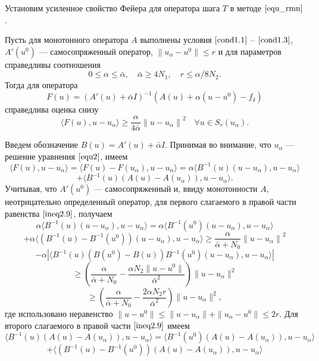 Установим усиленное свойство Фейера для оператора шага $T$ в методе $\eqref{equ_rmn}$.
\begin{theorem}\label{teo2.2} Пусть для монотонного оператора $A$ выполнены условия $\eqref{cond1.1}$ -- $\eqref{cond1.3}$, $A'(u^0)$ --- самосопряженный оператор, $\|u_\alpha-u^0\|\le r$ и для параметров справедливы соотношения 
	\begin{equation}\label{cond2.7}
	0\le\alpha\le\bar\alpha,\quad\bar\alpha\ge 4N_1,\quad r\le\alpha/8N_2.
	\end{equation}
	Тогда для оператора
	$$ F(u)=(A'(u)+\bar\alpha I)^{-1}(A(u)+\alpha(u-u^0)-f_\delta) $$
	справедлива оценка снизу
	\begin{equation}\label{est2.8}
	\langle F(u), u-u_\alpha\rangle\ge\frac{\alpha}{4\bar\alpha}{\|u-u_\alpha\|}^2 \quad \forall u \in S_r(u_\alpha).
	\end{equation}
\end{theorem}
\proof Введем обозначение $B(u)=A'(u)+\bar\alpha I$. Принимая во внимание, что $u_\alpha$ --- решение уравнения $\eqref{equ2}$, имеем
$$
\langle F(u), u-u_\alpha\rangle=\langle F(u)-F(u_\alpha), u-u_\alpha\rangle=\alpha\langle B^{-1}(u)(u-u_\alpha), u-u_\alpha\rangle$$ \begin{equation}\label{ineq2.9}+\langle B^{-1}(u)(A(u)-A(u_\alpha)), u-u_\alpha\rangle.
\end{equation}
Учитывая, что $A'(u^0)$ --- самосопряженный и, ввиду монотонности $A$, неотрицательно определенный оператор, для первого слагаемого в правой части равенства $\eqref{ineq2.9}$, получаем
$$\alpha\langle B^{-1}(u)(u-u_\alpha), u-u_\alpha\rangle=\alpha\langle B^{-1}(u^0)(u-u_\alpha), u-u_\alpha\rangle$$ $$+\alpha\langle (B^{-1}(u)-B^{-1}(u^0))(u-u_\alpha), u-u_\alpha\rangle \ge \frac{\alpha}{\bar\alpha+N_0}{\|u-u_\alpha\|}^2$$
$$ - \alpha|\langle B^{-1}(u)(B(u^0)-B(u))B^{-1}(u^0)(u-u_\alpha), u-u_\alpha\rangle| $$
$$\ge \left( \frac{\alpha}{\bar\alpha+N_0}-\frac{\alpha N_2\|u-u^0\|}{{\bar\alpha}^2}\right)\|u-u_\alpha\|^2$$
\begin{equation}\label{ineq2.10}
\ge\left(\frac{\alpha}{\bar\alpha+N_0}-\frac{2\alpha N_2r}{{\bar\alpha}^2}\right)\|u-u_\alpha\|^2,
\end{equation} где использовано неравенство $\|u-u^0\|\le\|u-u_\alpha\|+\|u_\alpha-u^0\|\le 2r$.
Для второго слагаемого в правой части $\eqref{ineq2.9}$ имеем
$$ \langle B^{-1}(u)(A(u)-A(u_\alpha)), u-u_\alpha\rangle= \langle B^{-1}(u^0)(A(u)-A(u_\alpha)), u-u_\alpha\rangle$$
$$+\langle (B^{-1}(u)-B^{-1}(u^0))(A(u)-A(u_\alpha)), u-u_\alpha\rangle$$

